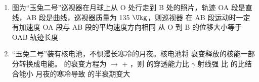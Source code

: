 \documentclass[\gkver]{gaokaozhenti}
\begin{document}
\begin{enumerate}
{B．铅球被水平推出后做平抛运动，竖直方向有  $v_{y}=gt$，则抛出后速度大小为  $v=\sqrt{v_{0}^{2}+\left(gt\right)^{2}}$，可知速度大小与时间不是一次函数关系，故 B 错误；

C. 铅球抛出后的动能

 $E_{k}=\frac{1}{2}mv^{2}=\frac{1}{2}m\left[v_{0}^{2}+\left(gt\right)^{2}\right]$

可知动能与时间不是一次函数关系，故 C 错误；

D．铅球水平抛出后由于忽略空气阻力，所以抛出后铅球机械能守恒，故 D 正确。故选 D。
}

\item
图为“玉兔二号”巡视器在月球上从 O 处行走到 B 处的照片，轨迹 OA 段是直线，AB 段是曲线，巡视器质量为 135 $\Ukg$，则巡视器
{在 AB 段运动时一定有加速度}
{OA 段与 AB 段的平均速度方向相同}
{从 O 到 B 的位移大小等于 OAB 轨迹长度}

\item
“玉兔二号”装有核电池，不惧漫长寒冷的月夜。核电池将  衰变释放的核能一部分转换成电能。 的衰变方程为  $\to$  + ，则
{ 的穿透能力比 $\gamma$ 射线强}
{ 比  的比结合能小}
{月夜的寒冷导致  的半衰期变大}
\end{enumerate}
\end{document}

